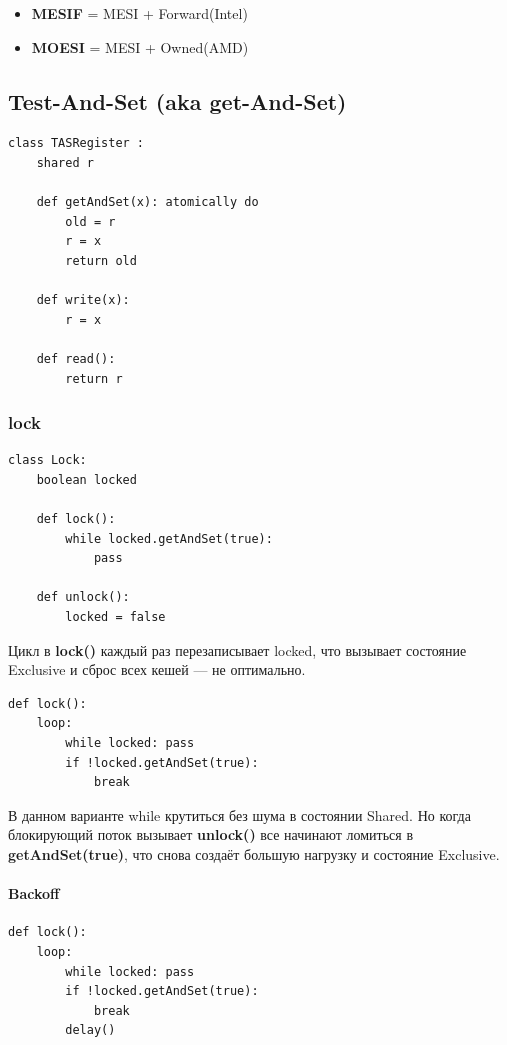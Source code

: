 \documentclass[10pt,a4paper,oneside,titlepage]{article}
\theoremstyle{plain}
\theoremstyle{defenition}
\begin{document}
\begin{itemize}
	\item {\bfseries MESIF} = MESI + Forward(Intel)
	\item {\bfseries MOESI} = MESI + Owned(AMD)
\end{itemize}

\subsection{Test-And-Set (aka get-And-Set)}

\begin{lstlisting}
class TASRegister :
    shared r
    
    def getAndSet(x): atomically do
        old = r
        r = x
        return old
        
    def write(x):
        r = x
        
    def read():
        return r
\end{lstlisting}

\subsubsection{lock}

\begin{lstlisting}
class Lock:
    boolean locked
    
    def lock():
        while locked.getAndSet(true):
            pass
            
    def unlock():
        locked = false
\end{lstlisting}

Цикл в {\bfseries lock()} каждый раз перезаписывает locked, что вызывает состояние Exclusive и сброс всех кешей --- не оптимально.

\begin{lstlisting}
def lock():
    loop:
        while locked: pass
        if !locked.getAndSet(true):
            break
\end{lstlisting}

В данном варианте while крутиться без шума в состоянии Shared. Но когда блокирующий поток вызывает {\bfseries unlock()} все начинают ломиться в {\bfseries getAndSet(true)}, что снова создаёт большую нагрузку и состояние Exclusive. 

\paragraph{Backoff}

\begin{lstlisting}
def lock():
    loop:
        while locked: pass
        if !locked.getAndSet(true):
            break
        delay()
\end{lstlisting}
\end{document}

